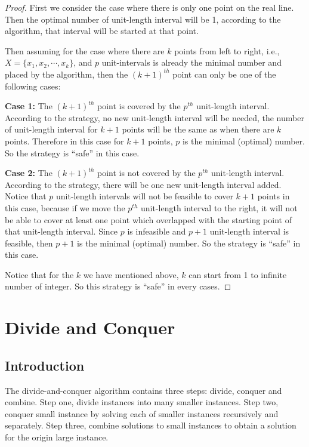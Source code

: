 					\begin{proof}
						First we consider the case where there is only one point on the real line. Then the optimal number of unit-length interval will be 1, according to the algorithm, that interval will be started at that point.

						Then assuming for the case where there are $k$ points from left to right, i.e., $X = \{x_1, x_2, \cdots, x_k\}$, and $p$ unit-intervals is already the minimal number and placed by the algorithm, then the $(k+1)^{th}$ point can only be one of the following cases:

						\textbf{Case 1:} The $(k+1)^{th}$ point is covered by the $p^{th}$ unit-length interval. According to the strategy, no new unit-length interval will be needed, the number of unit-length interval for $k+1$ points will be the same as when there are $k$ points. Therefore in this case for $k+1$ points, $p$ is the minimal (optimal) number. So the strategy is ``safe'' in this case.

						\textbf{Case 2:} The $(k+1)^{th}$ point is not covered by the $p^{th}$ unit-length interval. According to the strategy, there will be one new unit-length interval added. Notice that $p$ unit-length intervals will not be feasible to cover $k+1$ points in this case, because if we move the $p^{th}$ unit-length interval to the right, it will not be able to cover at least one point which overlapped with the starting point of that unit-length interval. Since $p$ is infeasible and $p+1$ unit-length interval is feasible, then $p+1$ is the minimal (optimal) number. So the strategy is ``safe'' in this case.

						Notice that for the $k$ we have mentioned above, $k$ can start from 1 to infinite number of integer. So this strategy is ``safe'' in every cases.
					\end{proof}

		\section{Divide and Conquer}
			\subsection{Introduction}
				The divide-and-conquer algorithm contains three steps: divide, conquer and combine. Step one, divide instances into many smaller instances. Step two, conquer small instance by solving each of smaller instances recursively and separately. Step three, combine solutions to small instances to obtain a solution for the origin large instance.

